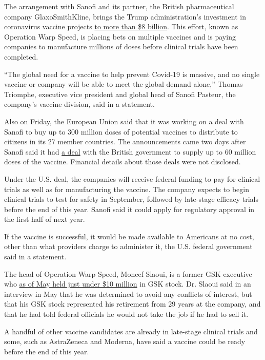 The arrangement with Sanofi and its partner, the British pharmaceutical
company GlaxoSmithKline, brings the Trump administration's investment in
coronavirus vaccine projects
\href{https://medicalcountermeasures.gov/app/barda/coronavirus/COVID19.aspx?filter=vaccine}{to
more than \$8 billion}. This effort, known as Operation Warp Speed, is
placing bets on multiple vaccines and is paying companies to manufacture
millions of doses before clinical trials have been completed.

``The global need for a vaccine to help prevent Covid-19 is massive, and
no single vaccine or company will be able to meet the global demand
alone,'' Thomas Triomphe, executive vice president and global head of
Sanofi Pasteur, the company's vaccine division, said in a statement.

Also on Friday, the European Union said that it was working on a deal
with Sanofi to buy up to 300 million doses of potential vaccines to
distribute to citizens in its 27 member countries. The announcements
came two days after Sanofi said it had
\href{https://www.sanofi.com/en/media-room/press-releases/2020/2020-07-29-07-00-00}{a
deal} with the British government to supply up to 60 million doses of
the vaccine. Financial details about those deals were not disclosed.

Under the U.S. deal, the companies will receive federal funding to pay
for clinical trials as well as for manufacturing the vaccine. The
company expects to begin clinical trials to test for safety in
September, followed by late-stage efficacy trials before the end of this
year. Sanofi said it could apply for regulatory approval in the first
half of next year.

If the vaccine is successful, it would be made available to Americans at
no cost, other than what providers charge to administer it, the U.S.
federal government said in a statement.

The head of Operation Warp Speed, Moncef Slaoui, is a former GSK
executive who
\href{https://www.nytimes3xbfgragh.onion/2020/05/20/health/coronavirus-vaccine-czar.html}{as
of May held just under \$10 million} in GSK stock. Dr. Slaoui said in an
interview in May that he was determined to avoid any conflicts of
interest, but that his GSK stock represented his retirement from 29
years at the company, and that he had told federal officials he would
not take the job if he had to sell it.

A handful of other vaccine candidates are already in late-stage clinical
trials and some, such as AstraZeneca and Moderna, have said a vaccine
could be ready before the end of this year.

